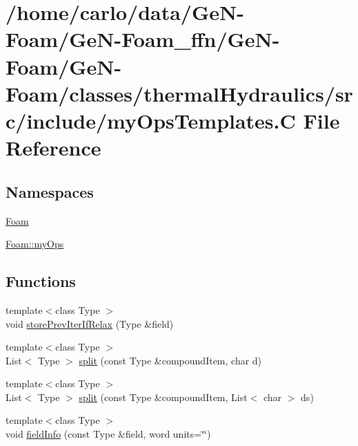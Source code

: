 \hypertarget{myOpsTemplates_8C}{}\section{/home/carlo/data/\+Ge\+N-\/\+Foam/\+Ge\+N-\/\+Foam\+\_\+ffn/\+Ge\+N-\/\+Foam/\+Ge\+N-\/\+Foam/classes/thermal\+Hydraulics/src/include/my\+Ops\+Templates.C File Reference}
\label{myOpsTemplates_8C}
\subsection*{Namespaces}
\begin{DoxyCompactItemize}
\item 
 \hyperlink{namespaceFoam}{Foam}
\item 
 \hyperlink{namespaceFoam_1_1myOps}{Foam\+::my\+Ops}
\end{DoxyCompactItemize}
\subsection*{Functions}
\begin{DoxyCompactItemize}
\item 
{\footnotesize template$<$class Type $>$ }\\void \hyperlink{namespaceFoam_1_1myOps_abeee007f59aa62edc180f978d5d730dc}{store\+Prev\+Iter\+If\+Relax} (Type \&field)
\item 
{\footnotesize template$<$class Type $>$ }\\List$<$ Type $>$ \hyperlink{namespaceFoam_1_1myOps_a9c6941fd6343a31e270e81867634452e}{split} (const Type \&compound\+Item, char d)
\item 
{\footnotesize template$<$class Type $>$ }\\List$<$ Type $>$ \hyperlink{namespaceFoam_1_1myOps_acee49ca9cdd20d6fb1250c0eff9bd2d0}{split} (const Type \&compound\+Item, List$<$ char $>$ ds)
\item 
{\footnotesize template$<$class Type $>$ }\\void \hyperlink{namespaceFoam_1_1myOps_a7c1be504bf64208dff04f082c8efda62}{field\+Info} (const Type \&field, word units=\char`\"{}\char`\"{})
\end{DoxyCompactItemize}
